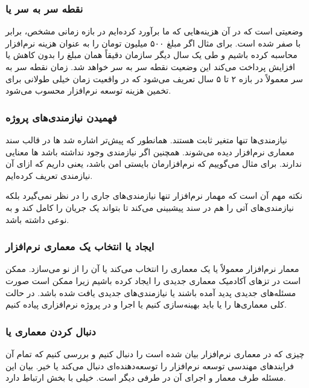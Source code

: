 \documentclass[a4paper]{article}
\begin{document}
\subsubsection*{نقطه سر به سر یا }

وضعیتی است که در آن هزینه‌هایی که ما برآورد کرده‌ایم در بازه زمانی مشخص، برابر
با صفر شده است. برای مثال اگر مبلغ ۵۰۰ میلیون تومان را به عنوان هزینه نرم‌افزار
محاسبه کرده باشیم و طی یک سال دیگر سازمان دقیقاً همان مبلغ را بدون کاهش یا
افزایش پرداخت می‌کند این وضعیت نقطه سر به سر خواهد شد. زمان نقطه سر به سر
معمولاً در بازه ۲ تا ۵ سال تعریف می‌شود که در واقعیت زمان خیلی طولانی برای تخمین
هزینه توسعه نرم‌افزار محسوب می‌شود.

\subsubsection{فهمیدن نیازمندی‌های پروژه}

نیازمندی‌ها تنها متغیر ثابت هستند. همانطور که پیش‌تر اشاره شد
ها در قالب سند معماری نرم‌افزار دیده می‌شوند. همچنین اگر
نیازمندی  وجود نداشته باشد ها معنایی ندارند.
برای مثال می‌گوییم که نرم‌افزارمان بایستی امن باشد، یعنی 
داریم که ازای آن نیازمندی  تعریف کرده‌ایم.

نکته مهم آن است که مهمار نرم‌افزار تنها نیازمندی‌های جاری را در نظر نمی‌گیرد
بلکه نیازمندی‌های آتی را هم در سند پیشبینی می‌کند تا بتواند یک جریان را کامل کند
و به نوعی  داشته باشد.

\subsubsection{ایجاد یا انتخاب یک معماری نرم‌افزار}

معمار نرم‌افزار معمولاً یا یک معماری را انتخاب می‌کند یا آن را از نو می‌سازد.
ممکن است در تز‌های آکادمیک معماری جدیدی را ایجاد کرده باشیم زیرا ممکن است صورت
مسئله‌های جدیدی پدید آمده باشند یا نیازمندی‌های  جدیدی یافت شده
باشد. در حالت کلی معماری‌ها را یا باید بهینه‌سازی کنیم یا اجرا و در پروژه
نرم‌افزاری پیاده کنیم.

\subsubsection{دنبال کردن معماری یا }

چیزی که در معماری نرم‌افزار بیان شده است را دنبال کنیم و بررسی کنیم که تمام آن
فرایند‌های مهندسی توسعه نرم‌افزار را توسعه‌دهنده‌ای دنبال می‌کند یا خیر. بیان
این مسئله طرف معمار و اجرای آن در طرفی دیگر است. خیلی با بخش  ارتباط دارد.
\end{document}

